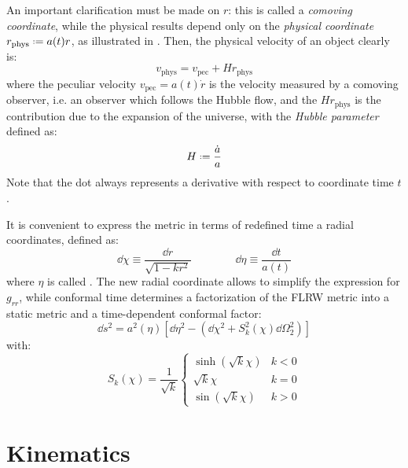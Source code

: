 An important clarification must be made on $ r $: this is called a \emph{comoving coordinate}, while the physical results depend only on the \emph{physical coordinate} $ r_\text{phys} \defeq a(t) r $, as illustrated in . Then, the physical velocity of an object clearly is:
\begin{equation}
  v_\text{phys} = v_\text{pec} + H r_\text{phys}
  \label{eq:hubble-flow}
\end{equation}
where the peculiar velocity $ v_\text{pec} = a(t) \dot{r} $ is the velocity measured by a comoving observer, i.e. an observer which follows the Hubble flow, and the  $ H r_\text{phys} $ is the contribution due to the expansion of the universe, with the \emph{Hubble parameter} defined as:
\begin{equation}
  H \defeq \frac{\dot{a}}{a}
  \label{eq:hubble-param}
\end{equation}
Note that the dot always represents a derivative with respect to coordinate time $ t $.

It is convenient to express the metric in terms of redefined time a radial coordinates, defined as:
\begin{equation}
  \dd \chi \equiv \frac{\dd r}{\sqrt{1 - k r^2}}
  \qquad \qquad
  \dd \eta \equiv \frac{\dd t}{a(t)}
  \label{eq:conformal-coordinates}
\end{equation}
where $ \eta $ is called . The new radial coordinate allows to simplify the expression for $ g_{rr} $, while conformal time determines a factorization of the FLRW metric into a static metric and a time-dependent conformal factor:
\begin{equation}
  \dd s^2 = a^2(\eta) \left[ \dd \eta^2 - \left( \dd \chi^2 + S_k^2(\chi) \dd \Omega_2^2 \right) \right]
\end{equation}
with:
\begin{equation}
  S_k(\chi) = \frac{1}{\sqrt{k}}
  \begin{cases}
    \sinh (\sqrt{k} \chi) & k < 0 \\
    \sqrt{k} \chi & k = 0 \\
    \sin (\sqrt{k} \chi) & k > 0
  \end{cases}
\end{equation}

\section{Kinematics}

